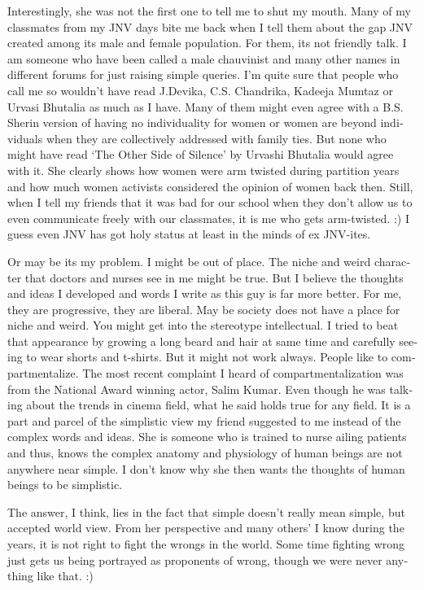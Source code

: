 \begin{english}
Interestingly, she was not the first one to tell me to shut my mouth. Many of my classmates from my JNV days bite me back when I tell them about the gap JNV created among its male and female population. For them, its not friendly talk. I am someone who have been called a male chauvinist and many other names in different forums for just raising simple queries. I'm quite sure that people who call me so wouldn't have read J.Devika, C.S. Chandrika, Kadeeja Mumtaz or Urvasi Bhutalia as much as I have. Many of them might even agree with a B.S. Sherin version of having no individuality for women or women are beyond individuals when they are collectively addressed with family ties. But none who might have read `The Other Side of Silence' by Urvashi Bhutalia would agree with it. She clearly shows how women were arm twisted during partition years and how much women activists considered the opinion of women back then. Still, when I tell my friends that it was bad for our school when they don't allow us to even communicate freely with our classmates, it is me who gets arm-twisted. :) I guess even JNV has got holy status at least in the minds of ex JNV-ites. 

Or may be its my problem. I might be out of place. The niche and weird character that doctors and nurses see in me might be true. But I believe the thoughts and ideas I developed and words I write as this guy is far more better. For me, they are progressive, they are liberal. May be society does not have a place for niche and weird. You might get into the stereotype intellectual. I tried to beat that appearance by growing a long beard and hair at same time and carefully seeing to wear shorts and t-shirts. But it might not work always. People like to compartmentalize. The most recent complaint I heard of compartmentalization was from the National Award winning actor, Salim Kumar. Even though he was talking about the trends in cinema field, what he said holds true for any field. It is a part and parcel of the simplistic view my friend suggested to me instead of the complex words and ideas. She is someone who is trained to nurse ailing patients and thus, knows the complex anatomy and physiology of human beings are not anywhere near simple. I don't know why she then wants the thoughts of human beings to be simplistic. 

The answer, I think, lies in the fact that simple doesn't really mean simple, but accepted world view. From her perspective and many others' I know during the years, it is not right to fight the wrongs in the world. Some time fighting wrong just gets us being portrayed as proponents of wrong, though we were never anything like that. :)
\end{english}
\newpage
